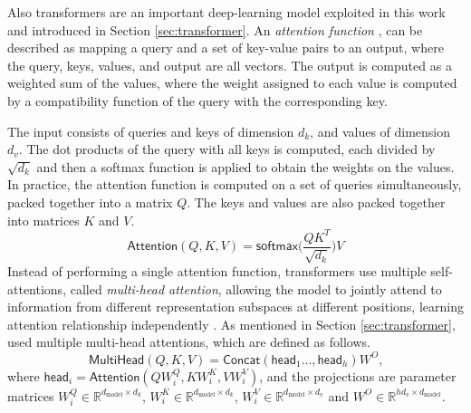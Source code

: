 \documentclass{article}
\begin{document}
	
	Also transformers are an important deep-learning model exploited in this work and introduced in 
	Section \ref{sec:transformer}. 	
	An \textit{attention function} \cite{vaswani2017attention}, can be described as mapping a query and 
	a set of key-value pairs to an output, where the query, keys, values, and output are all vectors. The 
	output is computed as a weighted sum of the values, where the weight assigned to each value is 
	computed by a compatibility function of the query with the corresponding key.
	
	The input consists of queries and keys of dimension $d_k$, and values of dimension $d_v$. The dot 
	products of the query with all keys is computed, each divided by $\sqrt{d_k}$ and then a 
	softmax function is applied to obtain the weights on the values.
	In practice, the attention function is computed on a set of queries simultaneously, packed together 
	into a matrix $Q$. The keys and values are also packed together into matrices $K$ and $V$. 
	\begin{equation}
		\label{eqn:attention}
		\mathsf{Attention}(Q, K, V) = \mathsf{softmax} \big( \frac{QK^T}{\sqrt{d_k}}\big)V
	\end{equation}
	Instead of performing a single attention function, transformers use multiple self-attentions, called 
	\textit{multi-head attention}, allowing the model to jointly attend to information from different 
	representation subspaces at different positions, learning attention relationship independently	
	\cite{vaswani2017attention}.
	As mentioned in	Section \ref{sec:transformer}, \citet{vaswani2017attention} used multiple 
	multi-head 
	attentions, which are defined as follows.
	\begin{equation}
		\label{eqn:multihead}
		{\mathsf{MultiHead}(Q, K, V) = \mathsf{Concat}(\mathsf{head}_1 \dots, 
			\mathsf{head}_h) W^O }
		\mbox{,}
	\end{equation}
	where $ \mathsf{head}_i = \mathsf{Attention}(QW_i^Q, KW_i^K , VW_i^V)$, and the 
	projections are parameter matrices $W_i^Q \in \mathbb{R}^{d_{\text{model}}\times 
	d_k}$, $W_i^K \in \mathbb{R}^{d_{\text{model}}\times d_k}$, $W_i^V \in 
	\mathbb{R}^{d_{\text{model}}\times d_v}$ and $W^O \in \mathbb{R}^{hd_v \times 
	d_{\text{model}}}$.
\end{document}
